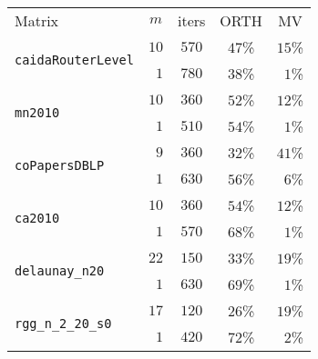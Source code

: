 \begin{tabular}{l|c|c|c|c}
\hline
\multirow{2}{*}{Matrix} & \multirow{2}{*}{$m$} & \multirow{2}{*}{iters} & \multirow{2}{*}{ORTH}& \multirow{2}{*}{MV} \\
 & & & & \\\hline
\hline
\multirow{2}{*}{\texttt{caidaRouterLevel}} & $10$ & $570$ & $47$\% & $15$\%\\
  & $\phantom{0}1$ & $780$ & $38$\% & $\phantom{0}1$\%\\\hline
\multirow{2}{*}{\texttt{mn2010}} & $10$ & $360$ & $52$\% & $12$\%\\
  & $\phantom{0}1$ & $510$ & $54$\% & $\phantom{0}1$\%\\\hline
\multirow{2}{*}{\texttt{coPapersDBLP}} & $\phantom{0}9$ & $360$ & $32$\% & $41$\%\\
  & $\phantom{0}1$ & $630$ & $56$\% & $\phantom{0}6$\%\\\hline
\multirow{2}{*}{\texttt{ca2010}} & $10$ & $360$ & $54$\% & $12$\%\\
  & $\phantom{0}1$ & $570$ & $68$\% & $\phantom{0}1$\%\\\hline
\multirow{2}{*}{\texttt{delaunay\_n20}} & $22$ & $150$ & $33$\% & $19$\%\\
  & $\phantom{0}1$ & $630$ & $69$\% & $\phantom{0}1$\%\\\hline
\multirow{2}{*}{\texttt{rgg\_n\_2\_20\_s0}} & $17$ & $120$ & $26$\% & $19$\%\\
  & $\phantom{0}1$ & $420$ & $72$\% & $\phantom{0}2$\%\\\hline
\end{tabular}